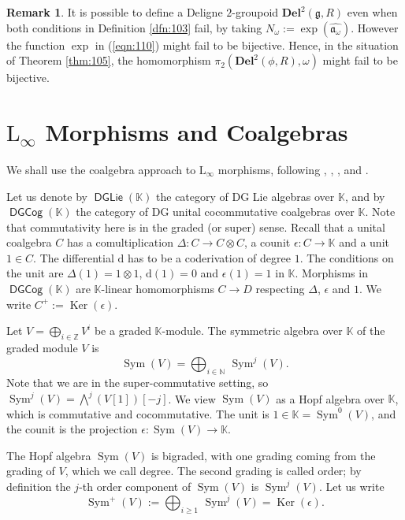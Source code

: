 \documentclass[a4paper,10pt]{amsart}
\theoremstyle{definition}
\newtheorem{rem}[equation]{Remark}
\numberwithin{equation}{section}
\newcommand{\opn}{\operatorname}
\newcommand{\cat}[1]{\operatorname{\mathsf{#1}}}
\newcommand{\mfrak}[1]{\mathfrak{#1}}
\newcommand{\mbf}[1]{\mathbf{#1}}
\newcommand{\mrm}[1]{\mathrm{#1}}
\newcommand{\mbb}[1]{\mathbb{#1}}
\newcommand{\boplus}{\bigoplus\nolimits}
\newcommand{\ot}{\otimes}
\newcommand{\what}[1]{\widehat{#1}}
\newcommand{\K}{\mbb{K}}
\newcommand{\N}{\mbb{N}}
\newcommand{\Z}{\mbb{Z}}
\newcommand{\g}{\mfrak{g}}
\renewcommand{\a}{\mfrak{a}}
\newcommand{\bwedge}{{\textstyle \bigwedge}}
\renewcommand{\d}{\mrm{d}}
\newcommand{\om}{\omega}
\newcommand{\ep}{\epsilon}
\begin{document}
\begin{rem}
It is possible to define a Deligne $2$-groupoid $\mbf{Del}^2(\g, R)$ even when
both conditions in Definition \ref{dfn:103} fail, by taking 
$N_{\om} := \exp(\what{\a_{\om}})$. 
However the function $\exp$ in (\ref{eqn:110}) might fail to be bijective.
Hence, in the situation of Theorem \ref{thm:105}, the homomorphism 
$\pi_2(\mbf{Del}^2(\phi, R), \om)$ might fail to be bijective.
\end{rem}






\section{$\mrm{L}_{\infty}$ Morphisms and Coalgebras}
\label{sec:L-infty}

We shall use the coalgebra approach to $\mrm{L}_{\infty}$ morphisms, following
\cite{Qu}, \cite[Section 4]{Ko2}, \cite{Hi2}, \cite[Section 3.7]{CKTB} and
\cite[Section 3]{Ye2}. 

Let us denote by $\cat{DGLie}(\K)$ the category of DG Lie algebras over $\K$,
and by $\cat{DGCog}(\K)$ the category of DG unital cocommutative coalgebras
over $\K$. Note that commutativity here is in the graded (or super) sense.
Recall that a unital coalgebra $C$ has a comultiplication 
$\Delta : C \to C \ot C$,
a counit $\ep : C \to \K$ and a unit $1 \in C$. The differential $\d$ has to be
a coderivation of degree $1$. The conditions on the unit are
$\Delta(1) = 1 \ot 1$, $\d(1) = 0$ and $\ep(1) = 1$ in $\K$. 
Morphisms in $\cat{DGCog}(\K)$ are $\K$-linear homomorphisms
$C \to D$ respecting
$\Delta$, $\ep$ and $1$. We write $C^+ := \opn{Ker}(\ep)$.

Let $V = \boplus_{i \in \Z} V^i$ be a graded $\K$-module. The 
symmetric algebra over $\K$ of the graded module $V$ is 
\[ \opn{Sym}(V) = \bigoplus_{i \in \N}\, \opn{Sym}^j(V) . \]
Note that we are in the super-commutative setting, so
$\opn{Sym}^j(V) = \bwedge^j(V[1])[-j]$.
We view $\opn{Sym}(V)$ as a Hopf algebra over $\K$, 
which is commutative and cocommutative. The unit is 
$1 \in \K = \opn{Sym}^0(V)$, and the counit is the projection
$\ep : \opn{Sym}(V) \to \K$.

The Hopf algebra $\opn{Sym}(V)$ is bigraded, with one grading coming from the
grading of $V$, which we call degree. The second grading is called order; by
definition the $j$-th order component of $\opn{Sym}(V)$ is $\opn{Sym}^j(V)$.
Let us write
\[ \opn{Sym}^+(V) := \bigoplus_{i \geq 1}\, \opn{Sym}^j(V) =
\opn{Ker}(\ep) . \]
\end{document}
